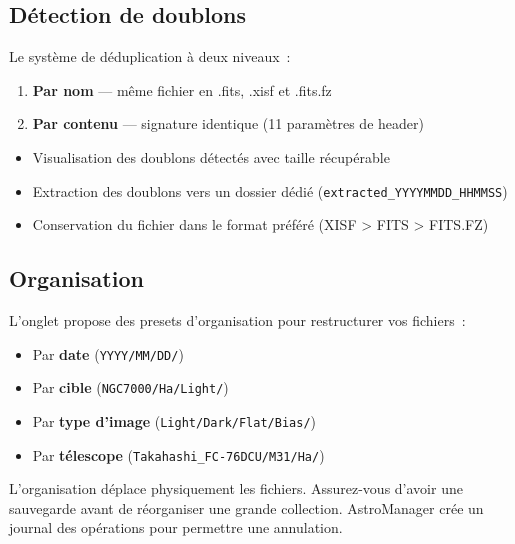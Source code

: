 \documentclass[a4paper,11pt]{article}
\begin{document}
\subsection{D\'{e}tection de doublons}

Le syst\`{e}me de d\'{e}duplication \`{a} deux niveaux~:

\begin{enumerate}
    \item \textbf{Par nom} --- m\^{e}me fichier en .fits, .xisf et .fits.fz
    \item \textbf{Par contenu} --- signature identique (11 param\`{e}tres de header)
\end{enumerate}

\begin{itemize}
    \item Visualisation des doublons d\'{e}tect\'{e}s avec taille r\'{e}cup\'{e}rable
    \item Extraction des doublons vers un dossier d\'{e}di\'{e} (\texttt{extracted\_YYYYMMDD\_HHMMSS})
    \item Conservation du fichier dans le format pr\'{e}f\'{e}r\'{e} (XISF > FITS > FITS.FZ)
\end{itemize}

\subsection{Organisation}

L'onglet propose des presets d'organisation pour restructurer vos fichiers~:

\begin{itemize}
    \item Par \textbf{date} (\texttt{YYYY/MM/DD/})
    \item Par \textbf{cible} (\texttt{NGC7000/Ha/Light/})
    \item Par \textbf{type d'image} (\texttt{Light/Dark/Flat/Bias/})
    \item Par \textbf{t\'{e}lescope} (\texttt{Takahashi\_FC-76DCU/M31/Ha/})
\end{itemize}

\begin{warningbox}
L'organisation d\'{e}place physiquement les fichiers. Assurez-vous d'avoir une sauvegarde avant de r\'{e}organiser une grande collection. AstroManager cr\'{e}e un journal des op\'{e}rations pour permettre une annulation.
\end{warningbox}


\end{document}
